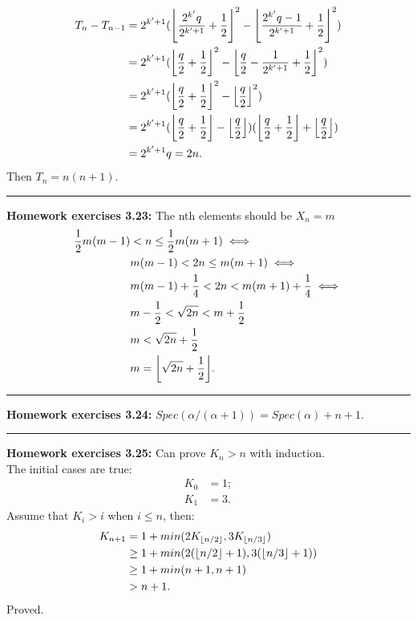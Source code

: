 \documentclass{article}
\DeclarePairedDelimiter\floor{\lfloor}{\rfloor}
\begin{document}
\begin{align}
T_n - T_{n-1} &= 2^{k'+1}(\floor*{\frac{2^{k'} q}{2^{k'+1}} + \frac{1}{2}}^2 - \floor*{\frac{2^{k'} q-1}{2^{k'+1}} + \frac{1}{2}}^2) \\
	      &= 2^{k'+1}(\floor*{\frac{q}{2} + \frac{1}{2}}^2 - \floor*{\frac{q}{2} - \frac{1}{2^{k'+1}} + \frac{1}{2}}^2) \\
	      &= 2^{k'+1}(\floor*{\frac{q}{2} + \frac{1}{2}}^2 - \floor*{\frac{q}{2}}^2)\\
	      &= 2^{k'+1}(\floor*{\frac{q}{2} + \frac{1}{2}} - \floor*{\frac{q}{2}})(\floor*{\frac{q}{2} + \frac{1}{2}} + \floor*{\frac{q}{2}})\\
	      &= 2^{k'+1}q = 2n.
\end{align}
Then $T_n = n(n+1)$.

\noindent\rule{\textwidth}{0.4pt}
\textbf{Homework exercises 3.23:}
The nth elements should be $X_n = m$
\begin{align}
\frac{1}{2}m(m-1) &< n \le \frac{1}{2}m(m+1) \iff  \\
		  &m(m-1) < 2n \le m(m+1) \iff  \\
		  &m(m-1) + \frac{1}{4} < 2n < m(m+1) + \frac{1}{4} \iff \\
		  &m - \frac{1}{2} < \sqrt{2n} < m + \frac{1}{2} \\
		  &m < \sqrt{2n} + \frac{1}{2} \\
		  &m = \floor*{\sqrt{2n} + \frac{1}{2}}.
\end{align}

\noindent\rule{\textwidth}{0.4pt}
\textbf{Homework exercises 3.24:}
$Spec(\alpha/(\alpha + 1)) = Spec(\alpha) + n + 1$.

\noindent\rule{\textwidth}{0.4pt}
\textbf{Homework exercises 3.25:}
Can prove $K_n > n$ with induction.\\
The initial cases are true:
\begin{align}
K_0 &= 1; \\
K_1 &= 3.
\end{align}
Assume that $K_i > i$ when $i\le n$, then:
\begin{align}
K_{n+1} &= 1 + min(2K_{\floor{n/2}}, 3K_{\floor{n/3}}) \\
	&\ge 1 + min(2(\floor{n/2}+1),3(\floor{n/3}+1)) \\
	&\ge 1 + min(n+1, n+1) \\
	&> n+1.
\end{align}
Proved.
\end{document}
